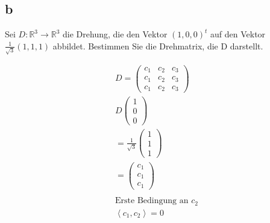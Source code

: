 \subsection{b}
Sei $D : \mathbb{R}^3 \rightarrow \mathbb{R}^3$ die Drehung, die den Vektor
$(1, 0, 0)^t$ auf den Vektor $\frac{1}{\sqrt{3}}(1, 1, 1)$ abbildet. Bestimmen
Sie die Drehmatrix, die D darstellt.

\begin{align*}
    D = \begin{pmatrix}
            c_1 & c_2 & c_3 \\
            c_1 & c_2 & c_3 \\
            c_1 & c_2 & c_3
        \end{pmatrix}                                                                                                                                     \\
    D\begin{pmatrix}
         1 \\ 0 \\ 0
     \end{pmatrix}                                                                                                                                         \\
    = \frac{1}{\sqrt{3}} \begin{pmatrix}
                             1 \\ 1 \\ 1
                         \end{pmatrix}                                                                                                                     \\
    = \begin{pmatrix}
          c_1 \\ c_1 \\ c_1
      \end{pmatrix}                                                                                                                                      \\\\
    \text{Erste Bedingung an } c_2                                                                                                                          \\
    \left\langle c_1, c_2 \right\rangle = 0                                                                                                                 \\

\end{align*}
